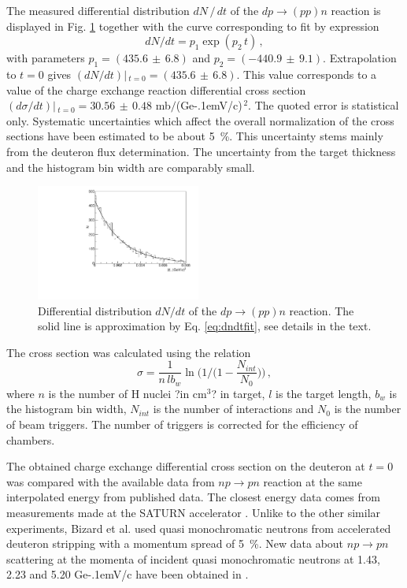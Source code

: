 \documentclass[twocolumn,epjc3]{svjour3}
\newcommand{\np}     {\ensuremath{np \rightarrow pn}\xspace}
\newcommand{\dpchex} {\ensuremath{dp \rightarrow (pp)n}\xspace}
\newcommand{\GeVc}   {Ge\kern-.1emV/c\xspace}
\begin{document}
The measured differential distribution $dN\,/\,dt$ of the \dpchex reaction is
displayed in Fig. \ref{fig:dndt} together with the curve corresponding to fit by
expression
\begin{equation}
  \label{eq:dndtfit}
  dN/dt = p_1\exp(p_2\,t)\,,
\end{equation}
with parameters $p_1=(435.6\,\pm\,6.8)$ and $p_2=(-440.9\,\pm\,9.1)$.
Extrapolation to $t=0$ gives $(dN/dt)|\,_{t=0}=(435.6\,\pm\,6.8)$. This value
corresponds to a value of the charge exchange reaction differential cross
section $(d\sigma/dt)|\,_{t=0}=30.56\,\pm\,0.48$ mb$/$(\GeVc)$^{\,2}$. The
quoted error is statistical only. Systematic uncertainties which affect the
overall normalization of the cross sections have been estimated to be about
5~\%. This uncertainty stems mainly from the deuteron flux determination. The
uncertainty from the target thickness and the histogram bin width are comparably
small.

\begin{figure}[h]
  \centering
  \includegraphics[width=0.48\textwidth]{dp_dN.pdf}
  \caption{Differential distribution $dN/dt$ of the \dpchex reaction. The solid
    line is approximation by Eq. \eqref{eq:dndtfit}, see details in the text.}
  \label{fig:dndt}
\end{figure}

The cross section was calculated using the relation
\begin{equation}
  \sigma =
  \frac{1}{n\,lb_w}\ln\bigg(1\Big/\Big(1-\frac{N_{int}}{N_0}\Big)\bigg)\,,
\end{equation}
where $n$ is the number of H nuclei ?in cm$^3$? in target, $l$ is the target
length, $b_w$ is the histogram bin width, $N_{int}$ is the number of
interactions and $N_0$ is the number of beam triggers. The number of triggers is
corrected for the efficiency of chambers.

The obtained charge exchange differential cross section on the deuteron at $t=0$
was compared with the available data from \np reaction at the same interpolated
energy from published data. The closest energy data comes from measurements made
at the SATURN accelerator \cite{biz75,bys78}. Unlike to the other similar
experiments, Bizard et al. \cite{biz75} used quasi monochromatic neutrons from
accelerated deuteron stripping with a momentum spread of 5~\%. New data about
\np scattering at the momenta of incident quasi monochromatic neutrons at 1.43,
2.23 and 5.20 \GeVc have been obtained in \cite{tro14}.
\end{document}
